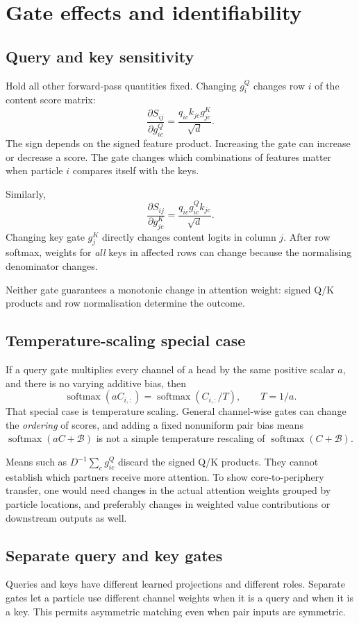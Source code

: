 \documentclass[11pt,a4paper]{article}
\newcommand{\softmax}{\operatorname{softmax}}
\numberwithin{equation}{section}
\begin{document}
\section{Gate effects and identifiability}
\subsection{Query and key sensitivity}
Hold all other forward-pass quantities fixed. Changing $g^Q_i$ changes
row $i$ of the content score matrix:
\[
 \frac{\partial S_{ij}}{\partial g^Q_{ic}}
 =\frac{q_{ic}k_{jc}g^K_{jc}}{\sqrt d}.
\]
The sign depends on the signed feature product. Increasing the gate can
increase or decrease a score.
The gate changes which combinations of features matter when particle $i$
compares itself with the keys.

Similarly,
\[
 \frac{\partial S_{ij}}{\partial g^K_{jc}}
 =\frac{q_{ic}g^Q_{ic}k_{jc}}{\sqrt d}.
\]
Changing key gate $g^K_j$ directly changes content logits in column $j$.
After row softmax, weights for \emph{all} keys in affected rows can change
because the normalising denominator changes.

Neither gate guarantees a monotonic change in attention weight: signed
Q/K products and row normalisation determine the outcome.

\subsection{Temperature-scaling special case}
If a query gate multiplies every channel of a head by the same positive
scalar $a$, and there is no varying additive bias, then
\[
 \softmax(aC_{i,:})=\softmax(C_{i,:}/T),\qquad T=1/a.
\]
That special case is temperature scaling. General channel-wise gates
can change the \emph{ordering} of scores, and adding a fixed nonuniform
pair bias means $\softmax(aC+\mathcal B)$ is not a simple temperature
rescaling of $\softmax(C+\mathcal B)$.

Means such as $D^{-1}\sum_cg^Q_{ic}$ discard the signed Q/K products.
They cannot establish which partners receive more attention. To show
core-to-periphery transfer, one would need changes in the actual
attention weights grouped by particle locations, and preferably changes
in weighted value contributions or downstream outputs as well.

\subsection{Separate query and key gates}
Queries and keys have different learned projections and different roles.
Separate gates let a particle use different channel weights when it is a
query and when it is a key. This permits asymmetric matching even when
pair inputs are symmetric.
\end{document}
